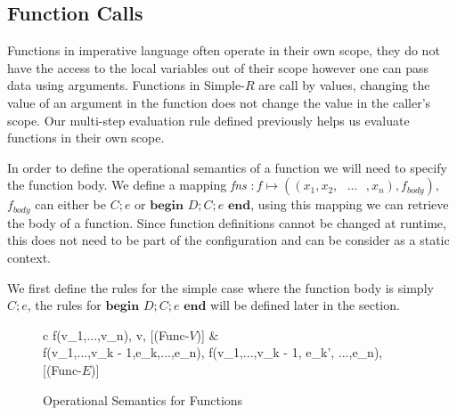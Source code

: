 \documentclass[a4paper,12pt]{report}
\begin{document}
\subsection{Function Calls} \label{section:functions_sos}
Functions in imperative language often operate in their own scope, they 
do not have the access to the local variables out of their scope however 
one can pass data using arguments. Functions in Simple-$R$ are call by values, 
changing the value of an argument in the function does not change the value in 
the caller's scope. Our multi-step evaluation rule defined previously helps us 
evaluate functions in their own scope. 

\par
In order to define the operational semantics of a function we will need to 
specify the function body. We define a mapping 
\textit{fns} $: f \mapsto ((x_1, x_2,\text{ }...\text{ },x_n), f_{body})$, 
$f_{body}$ can either be $C;e$ or $\textbf{begin }D;C;e\textbf{ end}$, 
using this mapping we can retrieve the body of a function. Since function  
definitions cannot be changed at runtime, this does not need to be part of the 
configuration and can be consider as a static context.

\par
We first define the rules for the simple case where the function body is simply 
$C;e$, the rules for $\textbf{begin }D;C;e\textbf{ end}$ will be defined later 
in the section. 
\begin{figure}[H]
  \begin{center}
    \begin{tabular} {c}
      {\langle f(v_1,\text{ }...\text{ },v_n), \sigma \rangle \Longrightarrow \langle v, \sigma \rangle} [(Func-$V$)]
      & \\
      {\langle f(v_1,\text{ }...\text{ },v_{k - 1},e_k,\text{ }...\text{ },e_n), 
      \sigma \rangle \Longrightarrow \langle f(v_1,\text{ }...\text{ },v_{k - 1}, e_{k}',
      \text{ }...\text{ },e_n), \sigma \rangle} [(Func-$E$)]
    \end{tabular}
  \end{center}
  \caption{Operational Semantics for Functions}
  \label{fig:basic_functions}
\end{figure}
\end{document}
